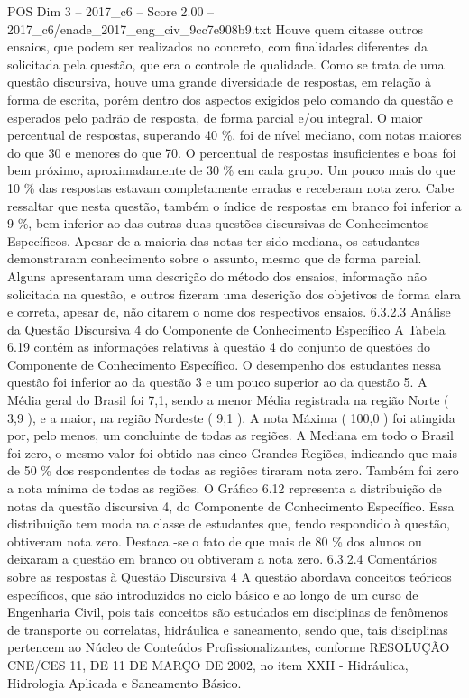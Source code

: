 \begin{textsample}{POS Dim 3 – 2017\_c6 – Score 2.00 – 2017\_c6/enade\_2017\_eng\_civ\_9cc7e908b9.txt}
Houve quem citasse outros ensaios, que podem ser realizados no concreto, com finalidades diferentes da solicitada pela questão, que era o controle de qualidade.
Como se trata de uma questão discursiva, houve uma grande diversidade de respostas, em relação à forma de escrita, porém dentro dos aspectos exigidos pelo comando da questão e esperados pelo padrão de resposta, de forma parcial e/ou integral.
O maior percentual de respostas, superando 40 \%, foi de nível mediano, com notas maiores do que 30 e menores do que 70.
O percentual de respostas insuficientes e boas foi bem próximo, aproximadamente de 30 \% em cada grupo.
Um pouco mais do que 10 \% das respostas estavam completamente erradas e receberam nota zero.
Cabe ressaltar que nesta questão, também o índice de respostas em branco foi inferior a 9 \%, bem inferior ao das outras duas questões discursivas de Conhecimentos Específicos.
Apesar de a maioria das notas ter sido mediana, os estudantes demonstraram conhecimento sobre o assunto, mesmo que de forma parcial.
Alguns apresentaram uma descrição do método dos ensaios, informação não solicitada na questão, e outros fizeram uma descrição dos objetivos de forma clara e correta, apesar de, não citarem o nome dos respectivos ensaios. 6.3.2.3 Análise da Questão Discursiva 4 do Componente de Conhecimento Específico A Tabela 6.19 contém as informações relativas à questão 4 do conjunto de questões do Componente de Conhecimento Específico.
O desempenho dos estudantes nessa questão foi inferior ao da questão 3 e um pouco superior ao da questão 5.
A Média geral do Brasil foi 7,1, sendo a menor Média registrada na região Norte ( 3,9 ), e a maior, na região Nordeste ( 9,1 ).
A nota Máxima ( 100,0 ) foi atingida por, pelo menos, um concluinte de todas as regiões.
A Mediana em todo o Brasil foi zero, o mesmo valor foi obtido nas cinco Grandes Regiões, indicando que mais de 50 \% dos respondentes de todas as regiões tiraram nota zero.
Também foi zero a nota mínima de todas as regiões.
O Gráfico 6.12 representa a distribuição de notas da questão discursiva 4, do Componente de Conhecimento Específico.
Essa distribuição tem moda na classe de estudantes que, tendo respondido à questão, obtiveram nota zero.
Destaca -se o fato de que mais de 80 \% dos alunos ou deixaram a questão em branco ou obtiveram a nota zero. 6.3.2.4 Comentários sobre as respostas à Questão Discursiva 4 A questão abordava conceitos teóricos específicos, que são introduzidos no ciclo básico e ao longo de um curso de Engenharia Civil, pois tais conceitos são estudados em disciplinas de fenômenos de transporte ou correlatas, hidráulica e saneamento, sendo que, tais disciplinas pertencem ao Núcleo de Conteúdos Profissionalizantes, conforme RESOLUÇÃO CNE/CES 11, DE 11 DE MARÇO DE 2002, no item XXII - Hidráulica, Hidrologia Aplicada e Saneamento Básico.

\end{textsample}
